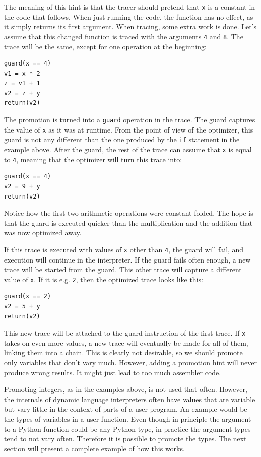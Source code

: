 \documentclass{sig-alternate}
\begin{document}
The meaning of this hint is that the tracer should pretend that \texttt{x} is a
constant
in the code that follows. When just running the code, the function has no
effect, as it simply returns its first argument. When tracing, some extra work
is done. Let's assume that this changed function is traced with
the arguments \texttt{4} and \texttt{8}. The trace will be the same, except for one
operation at the beginning:

\begin{Verbatim}
guard(x == 4)
v1 = x * 2
z = v1 + 1
v2 = z + y
return(v2)
\end{Verbatim}

The promotion is turned into a \texttt{guard} operation in the trace. The guard
captures the value of \texttt{x} as it was at runtime. From the point of view of the
optimizer, this guard is not any different than the one produced by the \texttt{if}
statement in the example above. After the guard, the rest of the trace can
assume that \texttt{x} is equal to \texttt{4}, meaning that the optimizer will turn this
trace into:

\begin{Verbatim}
guard(x == 4)
v2 = 9 + y
return(v2)
\end{Verbatim}

Notice how the first two arithmetic operations were constant folded. The hope is
that the guard is executed quicker than the multiplication and the addition that
was now optimized away.

If this trace is executed with values of \texttt{x} other than \texttt{4}, the guard will
fail, and execution will continue in the interpreter. If the guard fails often
enough, a new trace will be started from the guard. This other trace will
capture a different value of \texttt{x}. If it is e.g. \texttt{2}, then the optimized
trace looks like this:

\begin{Verbatim}
guard(x == 2)
v2 = 5 + y
return(v2)
\end{Verbatim}

This new trace will be attached to the guard instruction of the first trace. If
\texttt{x} takes on even more values, a new trace will eventually be made for all of them,
linking them into a chain. This is clearly not desirable, so we should promote
only variables that don't vary much. However, adding a promotion hint will never produce wrong
results. It might just lead to too much assembler code.

Promoting integers, as in the examples above, is not used that often.
However, the internals of dynamic language interpreters often
have values that are variable but vary little in the context of parts of a user
program. An example would be the types of variables in a user function. Even
though in principle the argument to a Python function could be any Python type,
in practice the argument types tend to not vary often. Therefore it is possible to
promote the types. The next section will present a complete example of how
this works.
\end{document}
